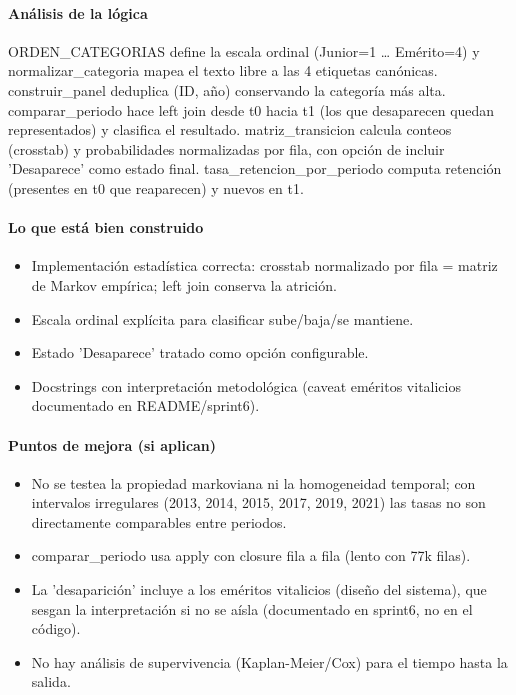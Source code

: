 \paragraph{Análisis de la lógica}
ORDEN\_CATEGORIAS define la escala ordinal (Junior=1 \dots{} Emérito=4) y normalizar\_categoria mapea el texto libre a las 4 etiquetas canónicas. construir\_panel deduplica (ID, año) conservando la categoría más alta. comparar\_periodo hace left join desde t0 hacia t1 (los que desaparecen quedan representados) y clasifica el resultado. matriz\_transicion calcula conteos (crosstab) y probabilidades normalizadas por fila, con opción de incluir 'Desaparece' como estado final. tasa\_retencion\_por\_periodo computa retención (presentes en t0 que reaparecen) y nuevos en t1.

\paragraph{Lo que está bien construido}
\begin{itemize}
  \item Implementación estadística correcta: crosstab normalizado por fila = matriz de Markov empírica; left join conserva la atrición.
  \item Escala ordinal explícita para clasificar sube/baja/se mantiene.
  \item Estado 'Desaparece' tratado como opción configurable.
  \item Docstrings con interpretación metodológica (caveat eméritos vitalicios documentado en README/sprint6).
\end{itemize}

\paragraph{Puntos de mejora (si aplican)}
\begin{itemize}
  \item No se testea la propiedad markoviana ni la homogeneidad temporal; con intervalos irregulares (2013, 2014, 2015, 2017, 2019, 2021) las tasas no son directamente comparables entre periodos.
  \item comparar\_periodo usa apply con closure fila a fila (lento con 77k filas).
  \item La 'desaparición' incluye a los eméritos vitalicios (diseño del sistema), que sesgan la interpretación si no se aísla (documentado en sprint6, no en el código).
  \item No hay análisis de supervivencia (Kaplan-Meier/Cox) para el tiempo hasta la salida.
\end{itemize}

